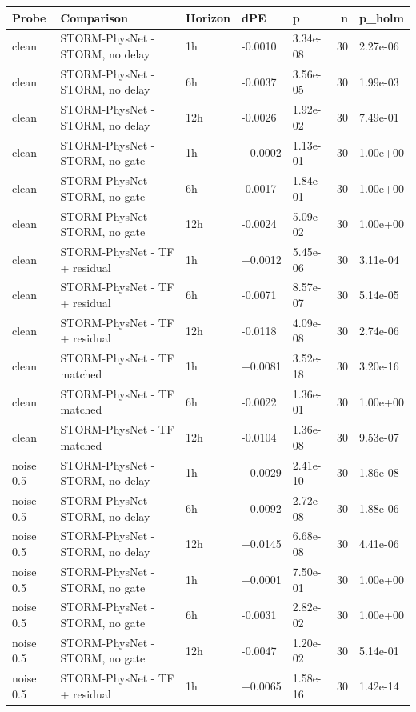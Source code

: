 \begin{tabular}{lllllrl}
\toprule
Probe & Comparison & Horizon & dPE & p & n & p\_holm \\
\midrule
clean & STORM-PhysNet - STORM, no delay & 1h & -0.0010 & 3.34e-08 & 30 & 2.27e-06 \\
clean & STORM-PhysNet - STORM, no delay & 6h & -0.0037 & 3.56e-05 & 30 & 1.99e-03 \\
clean & STORM-PhysNet - STORM, no delay & 12h & -0.0026 & 1.92e-02 & 30 & 7.49e-01 \\
clean & STORM-PhysNet - STORM, no gate & 1h & +0.0002 & 1.13e-01 & 30 & 1.00e+00 \\
clean & STORM-PhysNet - STORM, no gate & 6h & -0.0017 & 1.84e-01 & 30 & 1.00e+00 \\
clean & STORM-PhysNet - STORM, no gate & 12h & -0.0024 & 5.09e-02 & 30 & 1.00e+00 \\
clean & STORM-PhysNet - TF + residual & 1h & +0.0012 & 5.45e-06 & 30 & 3.11e-04 \\
clean & STORM-PhysNet - TF + residual & 6h & -0.0071 & 8.57e-07 & 30 & 5.14e-05 \\
clean & STORM-PhysNet - TF + residual & 12h & -0.0118 & 4.09e-08 & 30 & 2.74e-06 \\
clean & STORM-PhysNet - TF matched & 1h & +0.0081 & 3.52e-18 & 30 & 3.20e-16 \\
clean & STORM-PhysNet - TF matched & 6h & -0.0022 & 1.36e-01 & 30 & 1.00e+00 \\
clean & STORM-PhysNet - TF matched & 12h & -0.0104 & 1.36e-08 & 30 & 9.53e-07 \\
noise 0.5 & STORM-PhysNet - STORM, no delay & 1h & +0.0029 & 2.41e-10 & 30 & 1.86e-08 \\
noise 0.5 & STORM-PhysNet - STORM, no delay & 6h & +0.0092 & 2.72e-08 & 30 & 1.88e-06 \\
noise 0.5 & STORM-PhysNet - STORM, no delay & 12h & +0.0145 & 6.68e-08 & 30 & 4.41e-06 \\
noise 0.5 & STORM-PhysNet - STORM, no gate & 1h & +0.0001 & 7.50e-01 & 30 & 1.00e+00 \\
noise 0.5 & STORM-PhysNet - STORM, no gate & 6h & -0.0031 & 2.82e-02 & 30 & 1.00e+00 \\
noise 0.5 & STORM-PhysNet - STORM, no gate & 12h & -0.0047 & 1.20e-02 & 30 & 5.14e-01 \\
noise 0.5 & STORM-PhysNet - TF + residual & 1h & +0.0065 & 1.58e-16 & 30 & 1.42e-14 \\

\end{tabular}
